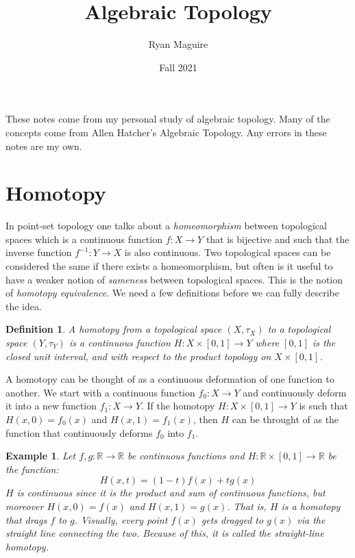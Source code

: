 \documentclass{article}
\title{Algebraic Topology}
\author{Ryan Maguire}
\date{Fall 2021}
\theoremstyle{plain}
\theoremstyle{normal}
\newtheorem{definition}{Definition}[section]
\newtheorem{example}{Example}[section]
\begin{document}
    \maketitle
    These notes come from my personal study of algebraic topology. Many of
    the concepts come from Allen Hatcher's Algebraic Topology.
    Any errors in these notes are my own.
    \tableofcontents
    \section{Homotopy}
        In point-set topology one talks about a
        \textit{homeomorphism} between topological spaces which is a
        continuous function $f:X\rightarrow{Y}$ that is bijective and such that
        the inverse function $f^{-1}:Y\rightarrow{X}$ is also continuous. Two
        topological spaces can be considered the same if there exists a
        homeomorphism, but often is it useful to have a weaker notion of
        \textit{sameness} between topological spaces. This is the notion of
        \textit{homotopy equivalence}. We need a few definitions before we
        can fully describe the idea.
        \begin{definition}
            \label{def:homotopy}%
            A homotopy from a topological space $(X,\tau_{X})$ to a topological
            space $(Y,\tau_{Y})$ is a continuous function
            $H:X\times[0,1]\rightarrow{Y}$ where $[0,1]$ is the closed unit
            interval, and with respect to the product topology
            on $X\times[0,1]$.
        \end{definition}
        A homotopy can be thought of as a continuous deformation of one
        function to another. We start with a continuous function
        $f_{0}:X\rightarrow{Y}$ and continuously deform it into a new function
        $f_{1}:X\rightarrow{Y}$. If the homotopy
        $H:X\times[0,1]\rightarrow{Y}$ is such that $H(x,0)=f_{0}(x)$ and
        $H(x,1)=f_{1}(x)$, then $H$ can be throught of as the function that
        continuously deforms $f_{0}$ into $f_{1}$.
        \begin{example}
            Let $f,g:\mathbb{R}\rightarrow\mathbb{R}$ be continuous functions
            and $H:\mathbb{R}\times[0,1]\rightarrow\mathbb{R}$ be the
            function:
            \begin{equation}
                H(x,t)=(1-t)f(x)+tg(x)
            \end{equation}
            $H$ is continuous since it is the product and sum of continuous
            functions, but moreover $H(x,0)=f(x)$ and $H(x,1)=g(x)$. That is,
            $H$ is a homotopy that drags $f$ to $g$. Visually, every point
            $f(x)$ gets dragged to $g(x)$ via the straight line connecting the
            two. Because of this, it is called the
            \textit{straight-line homotopy}.
        \end{example}
\end{document}
